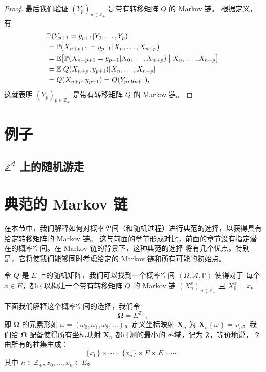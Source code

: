 \documentclass[fontset=none]{Notes}
\newcommand{\mat}[1]{\mathbold{#1}}
\begin{document}
\begin{proof}
  最后我们验证 $(Y_p)_{p\in \mathbb{Z}_+}$ 是带有转移矩阵 $Q$ 的 Markov 链。
  根据定义，有
  \begin{align*}
    &\mathbb{P}(Y_{p+1}=y_{p+1}|Y_0,\dots,Y_p)\\
    &=\mathbb{P}(X_{n+p+1}=y_{p+1}|X_n,\dots,X_{n+p})\\
    &=\mathbb{E}\bigl[\mathbb{P}(X_{n+p+1}=y_{p+1}|X_0,\dots,X_{n+p})\bigm| X_n,\dots,X_{n+p}\bigr]\\
    &=\mathbb{E}[Q(X_{n+p},y_{p+1})|X_n,\dots,X_{n+p}]\\
    &=Q(X_{n+p},y_{p+1})=Q(Y_p,y_{p+1}),
  \end{align*}
  这就表明 $(Y_p)_{p\in \mathbb{Z}_+}$ 是带有转移矩阵 $Q$ 的 Markov 链。
\end{proof}


\section{例子}

\subsection{$\mathbb{Z}^d$ 上的随机游走}


\section{典范的 Markov 链}

在本节中，我们解释如何对概率空间（和随机过程）进行典范的选择，以获得具有给定转移矩阵的 Markov 链。
这与前面的章节形成对比，前面的章节没有指定潜在的概率空间。在 Markov 链的背景下，这种典范的选择
将有几个优点。特别是，它将使我们能够同时考虑给定的 Markov 链和所有可能的初始点。

\begin{proposition}
  令 $Q$ 是 $E$ 上的随机矩阵，我们可以找到一个概率空间 $(\Omega,\mathcal{A},\mathbb{P})$ 使得对于
  每个 $x\in E$，都可以构建一个带有转移矩阵 $Q$ 的 Markov 链 $(X_n^x)_{n\in \mathbb{Z}_+}$ 且
  $X_0^x=x$。
\end{proposition}

下面我们解释这个概率空间的选择，我们令
\[
  \mat\Omega=E^{\mathbb{Z}_+},
\]
即 $\mat\Omega$ 的元素形如 $\omega=(\omega_0,\omega_1,\omega_2,\dots)$。定义坐标映射
$\mat X_n$ 为 $\mat X_n(\omega)=\omega_n$。我们给 $\mat\Omega$ 配备使得所有坐标映射
$\mat X_n$ 都可测的最小的 $\sigma$-域，记为 $\mathfrak{F}$，等价地说，
$\mathfrak{F}$ 由所有的柱集生成：
\[
  \{x_0\}\times\cdots\times\{x_n\}\times E\times E\times \cdots,
\]
其中 $n\in \mathbb{Z}_+,x_0,\dots,x_n\in E$。
\end{document}
